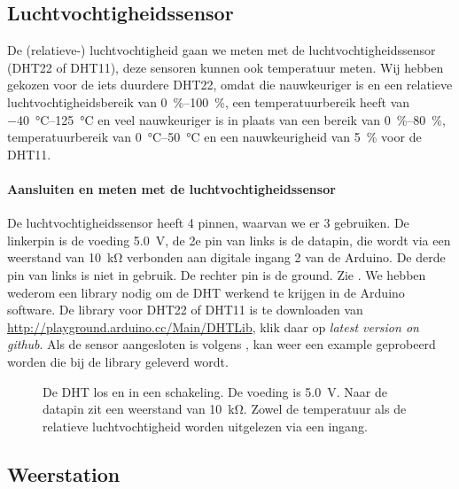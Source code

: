 \subsection{Luchtvochtigheidssensor}

De (relatieve-) luchtvochtigheid gaan we meten met de
luchtvochtigheidssensor (DHT22 of DHT11), deze sensoren kunnen ook
temperatuur meten. Wij hebben gekozen voor de iets duurdere DHT22, omdat
die nauwkeuriger is en een relatieve luchtvochtigheidsbereik van
\SIrange{0}{100}{\percent}, een temperatuurbereik heeft van
\SIrange{-40}{125}{\degreeCelsius} en veel
nauwkeuriger is in plaats van een bereik van \SIrange{0}{80}{\percent},
temperatuurbereik van \SIrange{0}{50}{\degreeCelsius} en een
nauwkeurigheid van \SI{5}{\percent} voor de DHT11.

\paragraph{Aansluiten en meten met de luchtvochtigheidssensor}

De luchtvochtigheidssensor heeft 4 pinnen, waarvan we er 3 gebruiken. De
linkerpin is de voeding \SI{5.0}{\volt}, de 2e pin van links is de
datapin, die wordt via een weerstand van \SI{10}{\kilo\ohm} verbonden
aan digitale ingang 2 van de Arduino. De derde pin van links is niet in
gebruik. De rechter pin is de ground. Zie . We hebben
wederom een library nodig om de DHT werkend te krijgen in de Arduino
software. De library voor DHT22 of DHT11 is te downloaden van
\url{http://playground.arduino.cc/Main/DHTLib}, klik daar op
\emph{latest version on github}. Als de sensor aangesloten is volgens
, kan weer een example geprobeerd
worden die bij de library geleverd wordt.

\begin{figure}
    \centering
    \hfill
    \caption{De DHT los en in een schakeling. De voeding is \SI{5.0}{\volt}. 
    Naar de datapin zit een weerstand van \SI{10}{\kilo\ohm}. Zowel de
    temperatuur als de relatieve luchtvochtigheid worden uitgelezen via
    een ingang.}
\end{figure}

\subsection{Weerstation}

